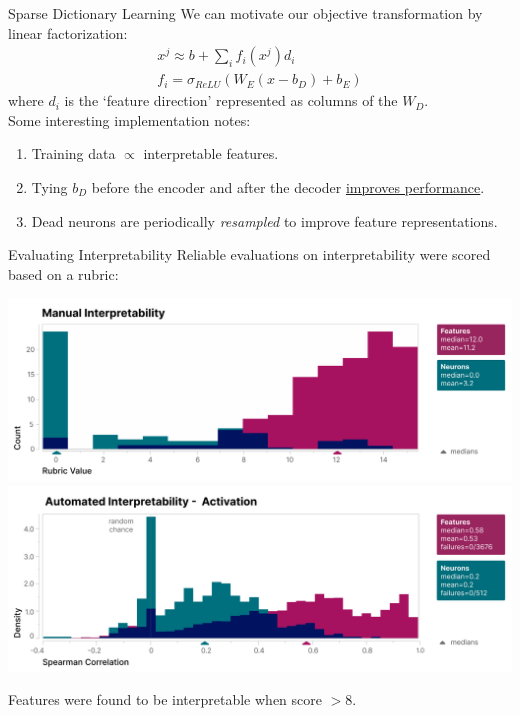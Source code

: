 \documentclass{beamer}
\begin{document}
\begin{frame}{Sparse Dictionary Learning}
	We can motivate our objective transformation by linear factorization:
	\begin{gather}
		x^j \approx b + \sum_i f_i(x^j)d_i \\
		f_i = \sigma_{ReLU}(W_E(x-b_D)+ b_E)
	\end{gather}
	where $d_i$ is the `feature direction' represented as columns of the $W_D$. \pause \newline \\
	
	Some interesting implementation notes:
	\begin{enumerate}[label=\alph*.]
		\item Training data $\propto$ interpretable features. \pause
		\item Tying $b_D$ before the encoder and after the decoder \underline{improves performance}. \pause
		\item Dead neurons are periodically \textit{resampled} to improve feature representations.
	\end{enumerate}
\end{frame}

\begin{frame}{Evaluating Interpretability}
	Reliable evaluations on interpretability were scored based on a rubric:
	\begin{center}
		\includegraphics[width=.7\textwidth]{img/scores.png}
		\includegraphics[width=.7\textwidth]{img/ascores-activ.png}
	\end{center}
	\vspace{-1em}
	Features were found to be interpretable when score $> 8$.
\end{frame}

\end{document}
